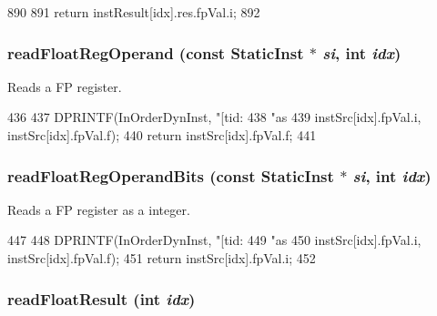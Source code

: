 \begin{DoxyCode}
890     {
891        return instResult[idx].res.fpVal.i;
892     }
\end{DoxyCode}
\hypertarget{classInOrderDynInst_a717c88c8c56d79c9ed554ba5992bd8c3}{
\subsubsection[{readFloatRegOperand}]{ readFloatRegOperand (const {\bf StaticInst} $\ast$ {\em si}, \/  int {\em idx})}}
\label{classInOrderDynInst_a717c88c8c56d79c9ed554ba5992bd8c3}
Reads a FP register. 


\begin{DoxyCode}
436 {
437     DPRINTF(InOrderDynInst, "[tid:%
438             "as %
439             instSrc[idx].fpVal.i, instSrc[idx].fpVal.f);
440     return instSrc[idx].fpVal.f;
441 }
\end{DoxyCode}
\hypertarget{classInOrderDynInst_a39d93624e4481f4a210f2c46ea6b15b0}{
\subsubsection[{readFloatRegOperandBits}]{ readFloatRegOperandBits (const {\bf StaticInst} $\ast$ {\em si}, \/  int {\em idx})}}
\label{classInOrderDynInst_a39d93624e4481f4a210f2c46ea6b15b0}
Reads a FP register as a integer. 


\begin{DoxyCode}
447 {
448     DPRINTF(InOrderDynInst, "[tid:%
449             "as %
450             instSrc[idx].fpVal.i, instSrc[idx].fpVal.f);
451     return instSrc[idx].fpVal.i;
452 }
\end{DoxyCode}
\hypertarget{classInOrderDynInst_a69fdad14fd08c464a87e7d8f878eea27}{
\subsubsection[{readFloatResult}]{ readFloatResult (int {\em idx})}}
\label{classInOrderDynInst_a69fdad14fd08c464a87e7d8f878eea27}



